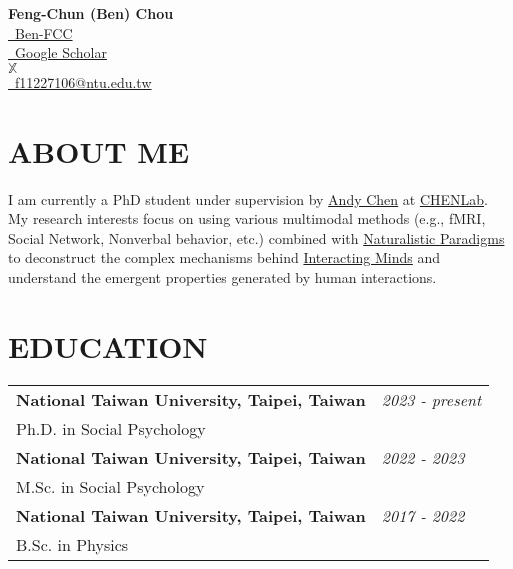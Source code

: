 \documentclass[a4paper,12pt]{article}
\newcommand{\sectionspace}{0pt} %
\begin{document}
\sloppy %

\begin{center}
    \textbf{\Huge Feng-Chun (Ben) Chou} \\
    \vspace{10pt}
    \href{https://github.com/Ben-FCC}{\color{black}\faGithub \ Ben-FCC} \\
    \href{https://scholar.google.com/citations?user=oZ5rsb0AAAAJ&hl=en}{\color{black}\faGoogle \ Google Scholar}\\
    \href{https://x.com/FengChunChou}{$\mathbb{X}$ \@FengChunChou}\\
    \href{mailto:f11227106@ntu.edu.tw}{\color{black}\faEnvelope \ f11227106@ntu.edu.tw} \\
    
\end{center}

\vspace{10pt}

\section*{ABOUT ME}
I am currently a PhD student under supervision by \href{https://scholar.google.com/citations?hl=en&user=wXNCX4EAAAAJ&view_op=list_works&sortby=pubdate}{Andy Chen} at \href{https://www.chenlaboratory.com/}{CHENLab}. My research interests focus on using various multimodal methods (e.g., fMRI, Social Network, Nonverbal behavior, etc.) combined with \href{https://naturalistic-data.org/content/intro.html}{Naturalistic Paradigms} to deconstruct the complex mechanisms behind \href{https://cosanlab.com/static/papers/Wheatley_2023_PISP.pdf}{Interacting Minds} and understand the emergent properties generated by human interactions.
\vspace{\sectionspace}

\section*{EDUCATION}

\begin{flushright}
\begin{tabular}{@{}p{}@{}p{}@{}}
    \textbf{National Taiwan University, Taipei, Taiwan} & \hfill \textit{2023 - present} \\
    Ph.D. in Social Psychology & \\[6pt]
    \textbf{National Taiwan University, Taipei, Taiwan} & \hfill \textit{2022 - 2023} \\
    M.Sc. in Social Psychology & \\[6pt]
    \textbf{National Taiwan University, Taipei, Taiwan} & \hfill \textit{2017 - 2022} \\
    B.Sc. in Physics & \\
\end{tabular}
\end{flushright}
\end{document}
